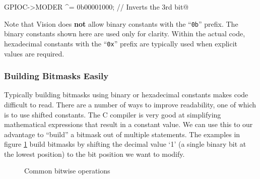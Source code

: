 \documentclass[11pt,fleqn]{book} %
\makeatletter
\newcommand{\ilcode}[1]{
    \smallskip
    \colorbox{gray!20!white}{
        \centering
        \parbox{\linewidth-2\fboxsep}{
            \lstinline@#1@
        }
    }
}
\newcommand{\code}[3]{
    \begin{figure}[]
        \colorbox{gray!20!white}{
            \parbox{\linewidth-2\fboxsep} {
                \centering 
                
            }
        }
        \caption{#2}
        \label{#3}
    \end{figure}
}
\makeatother
\begin{document}
\ilcode{GPIOC->MODER ^= 0b00001000;    // Inverts the 3rd bit}%

\begin{warning}
    Note that {\textmu}Vision does \textbf{not} allow binary constants with the ``\texttt{0b}'' prefix. The binary constants shown here are used only for clarity. Within the actual code, hexadecimal constants with the ``\texttt{0x}'' prefix are typically used when explicit values are required.  
\end{warning}

\subsubsection{Building Bitmasks Easily}

Typically building bitmasks using binary or hexadecimal constants makes code difficult to read. There are a number of ways to improve readability, one of which is to use shifted constants. The C compiler is very good at simplifying mathematical expressions that result in a constant value. We can use this to our advantage to ``build'' a bitmask out of multiple statements. The examples in figure \ref{bitwise} build bitmasks by shifting the decimal value `1' (a single binary bit at the lowest position) to the bit position we want to modify.

\code{./files/bitops.c}{Common bitwise operations}{bitwise}

%        





\end{document}
